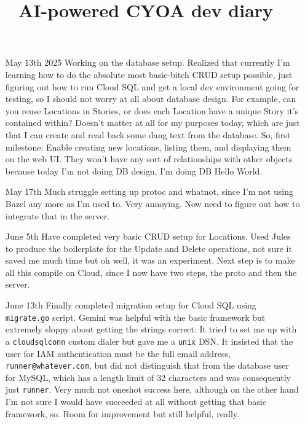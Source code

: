 \documentclass[12pt]{article}
\title{AI-powered CYOA dev diary}
\begin{document}
\begin{itemize}
\item[May 13th 2025] Working on the database setup. Realized that
  currently I'm learning how to do the absolute most basic-bitch CRUD
  setup possible, just figuring out how to run Cloud SQL and get a
  local dev environment going for testing, so I should not worry at
  all about database design. For example, can you reuse Locations in
  Stories, or does each Location have a unique Story it's contained
  within? Doesn't matter at all for my purposes today, which are just
  that I can create and read back some dang text from the
  database. So, first milestone: Enable creating new locations,
  listing them, and displaying them on the web UI. They won't have any
  sort of relationships with other objects because today I'm not doing
  DB design, I'm doing DB Hello World.
\item[May 17th] Much struggle setting up protoc and whatnot, since I'm
  not using Bazel any more as I'm used to. Very annoying. Now need to
  figure out how to integrate that in the server.
\item[June 5th] Have completed very basic CRUD setup for
  Locations. Used Jules to produce the boilerplate for the Update and
  Delete operations, not sure it saved me much time but oh well, it
  was an experiment. Next step is to make all this compile on Cloud,
  since I now have two steps, the proto and then the server.
\item[June 13th] Finally completed migration setup for Cloud SQL using
  \verb|migrate.go| script. Gemini was helpful with the basic
  framework but extremely sloppy about getting the strings correct: It
  tried to set me up with a \verb|cloudsqlconn| custom dialer but gave
  me a \verb|unix| DSN. It insisted that the user for IAM
  authentication must be the full email address,
  \verb|runner@whatever.com|, but did not distinguish that from the
  database user for MySQL, which has a length limit of 32 characters
  and was consequently just \verb|runner|. Very much not oneshot
  success here, although on the other hand I'm not sure I would have
  succeeded at all without getting that basic framework, so. Room for
  improvement but still helpful, really.
\end{itemize}
\end{document}
